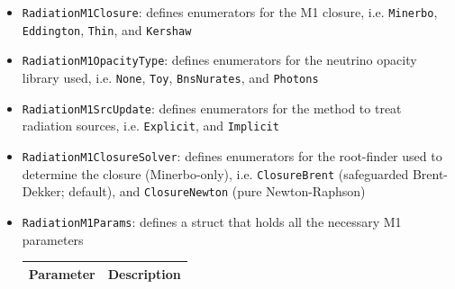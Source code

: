 \documentclass{article}
\newcommand{\var}[1]{%
  {\setlength{\fboxsep}{1.5pt}%
   \colorbox{varbg}{\textcolor{varfg}{\texttt{\small #1}}}}}
\begin{document}
\begin{itemize}
  \item \var{RadiationM1Closure}: defines enumerators for the M1 closure, i.e. \var{Minerbo}, \var{Eddington}, \var{Thin}, and \var{Kershaw}
  \item \var{RadiationM1OpacityType}: defines enumerators for the neutrino opacity library used, i.e. \var{None}, \var{Toy}, \var{BnsNurates}, and \var{Photons}
  \item \var{RadiationM1SrcUpdate}: defines enumerators for the method to treat radiation sources, i.e. \var{Explicit}, and \var{Implicit}
  \item \var{RadiationM1ClosureSolver}: defines enumerators for the root-finder used to determine the closure (Minerbo-only), i.e. \var{ClosureBrent} (safeguarded Brent-Dekker;
  default), and \var{ClosureNewton} (pure Newton-Raphson)
  \item \var{RadiationM1Params}: defines a struct that holds all the necessary M1 parameters
  \begin{tabularx}{\textwidth}{|l|X|}
    \hline
    \textbf{Parameter}&\textbf{Description}\\
    \endfirsthead

    \endhead


\end{tabularx}
\end{itemize}
\end{document}
